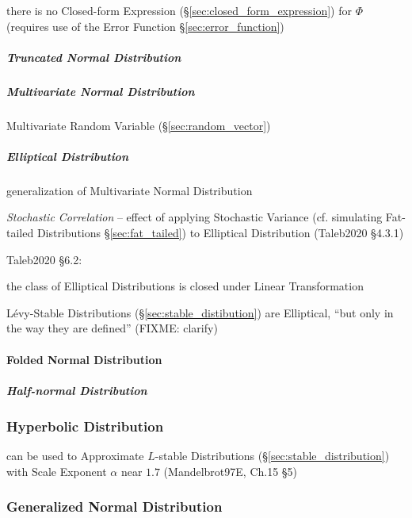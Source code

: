 there is no Closed-form Expression (\S\ref{sec:closed_form_expression}) for
$\Phi$ (requires use of the Error Function \S\ref{sec:error_function})



\subparagraph{Truncated Normal Distribution}\label{sec:truncated_normal}\hfill

\subparagraph{Multivariate Normal Distribution}\label{sec:multivariate_normal}
\hfill

Multivariate Random Variable (\S\ref{sec:random_vector})



\subparagraph{Elliptical Distribution}\label{sec:elliptical_distribution}
\hfill

generalization of Multivariate Normal Distribution

\emph{Stochastic Correlation} -- effect of applying Stochastic Variance (cf.
simulating Fat-tailed Distributions \S\ref{sec:fat_tailed}) to Elliptical
Distribution (Taleb2020 \S 4.3.1)

Taleb2020 \S 6.2:

the class of Elliptical Distributions is closed under Linear Transformation

L\'evy-Stable Distributions (\S\ref{sec:stable_distibution}) are Elliptical,
``but only in the way they are defined'' (FIXME: clarify)



\paragraph{Folded Normal Distribution}\label{sec:folded_normal}\hfill

\subparagraph{Half-normal Distribution}\label{sec:half_normal}\hfill



\subsubsection{Hyperbolic Distribution}\label{sec:hyperbolic_distribution}

can be used to Approximate $L$-stable Distributions
(\S\ref{sec:stable_distribution}) with Scale Exponent $\alpha$ near $1.7$
(Mandelbrot97E, Ch.15 \S 5)



\subsubsection{Generalized Normal Distribution}\label{sec:generalized_normal}

